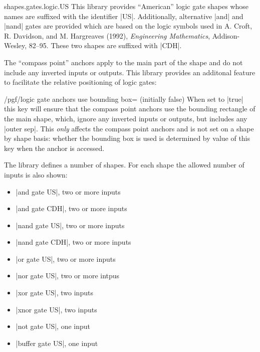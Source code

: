 \begin{pgflibrary}{shapes.gates.logic.US}
  This library provides ``American'' logic gate shapes whose names are 
  suffixed with the identifier |US|. Additionally,
  alternative |and| and |nand| gates are provided which are based on the 
  logic symbols used in A. Croft, R. Davidson, and M. Hargreaves (1992), 
  \emph{Engineering Mathematics}, Addison-Wesley, 82--95. These two 
  shapes are suffixed with |CDH|. 

  The ``compass point'' anchors apply to the main part of the shape
  and do not include any inverted inputs or outputs. This library
  provides an additonal feature to facilitate the relative positioning
  of logic gates:

\begin{key}{/pgf/logic gate anchors use bounding box= (initially false)}
  When set to |true| this key will ensure that the 
  compass point anchors use the bounding rectangle of the
  main shape, which, ignore any inverted inputs or outputs, but
  includes any |outer sep|. 
  This \emph{only} affects the compass point anchors
  and is not set on a shape by shape basis: whether the bounding
  box is used is determined by value of this key when the anchor
  is accessed.

\begin{codeexample}[]
\end{codeexample} 

\end{key}

  The library defines a number of shapes. For each shape the allowed
  number of inputs is also shown:
  \begin{itemize}
  \item |and gate US|, two or more inputs
  \item |and gate CDH|, two or more inputs
  \item |nand gate US|, two or more inputs
  \item |nand gate CDH|, two or more inputs
  \item |or gate US|, two or more inputs
  \item |nor gate US|, two or more intpus
  \item |xor gate US|, two inputs
  \item |xnor gate US|, two inputs
  \item |not gate US|, one input
  \item |buffer gate US|, one input
  \end{itemize}


\end{pgflibrary}
